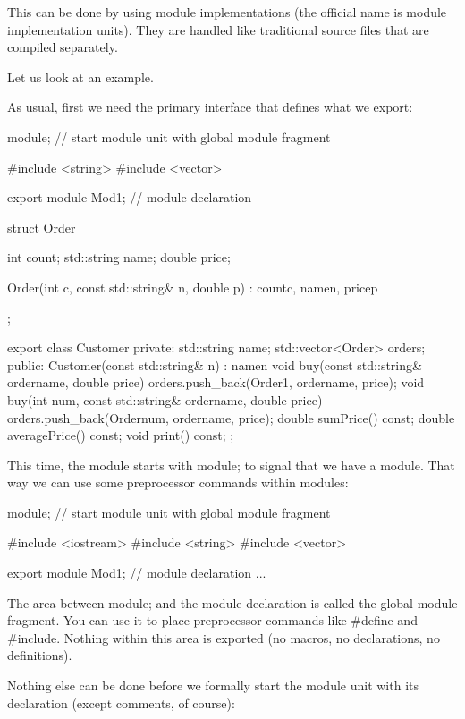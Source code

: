 This can be done by using module implementations (the official name is module implementation units). They are handled like traditional source files that are compiled separately.

Let us look at an example.


As usual, first we need the primary interface that defines what we export:


\begin{cpp}
module; // start module unit with global module fragment

#include <string>
#include <vector>

export module Mod1; // module declaration

struct Order {
	int count;
	std::string name;
	double price;
	
	Order(int c, const std::string& n, double p)
	: count{c}, name{n}, price{p} {
	}
};

export class Customer {
private:
	std::string name;
	std::vector<Order> orders;
public:
	Customer(const std::string& n)
	: name{n} {
	}
	void buy(const std::string& ordername, double price) {
		orders.push_back(Order{1, ordername, price});
	}
	void buy(int num, const std::string& ordername, double price) {
		orders.push_back(Order{num, ordername, price});
	}
	double sumPrice() const;
	double averagePrice() const;
	void print() const;
};
\end{cpp}

This time, the module starts with module; to signal that we have a module. That way we can use some preprocessor commands within modules:

\begin{cpp}
module; // start module unit with global module fragment

#include <iostream>
#include <string>
#include <vector>

export module Mod1; // module declaration
...
\end{cpp}

The area between module; and the module declaration is called the global module fragment. You can use it to place preprocessor commands like \#define and \#include. Nothing within this area is exported (no macros, no declarations, no definitions).

Nothing else can be done before we formally start the module unit with its declaration (except comments, of course):

